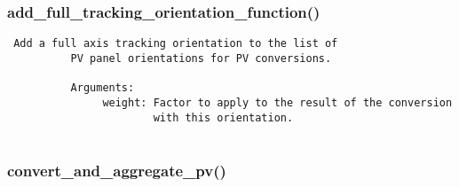 \subsubsection{add\_full\_tracking\_orientation\_function()}


\begin{verbatim}
 Add a full axis tracking orientation to the list of
          PV panel orientations for PV conversions. 
          
          Arguments:
               weight: Factor to apply to the result of the conversion
                       with this orientation.
          
\end{verbatim}
\subsubsection{convert\_and\_aggregate\_pv()}


